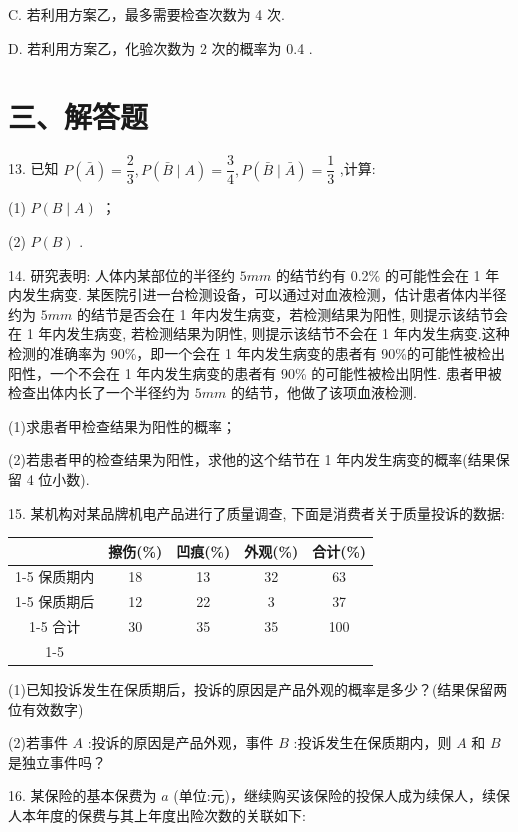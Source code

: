 C. 若利用方案乙，最多需要检查次数为 4 次.

D. 若利用方案乙，化验次数为 2 次的概率为 0.4 .

\section*{三、解答题}

13. 已知 $P\left( \bar{A}\right)  = \dfrac{2}{3},P\left( {\bar{B} \mid  A}\right)  = \dfrac{3}{4},P\left( {\bar{B} \mid  \bar{A}}\right)  = \dfrac{1}{3}$ ,计算:

(1) $P\left( {B \mid  A}\right)$ ；

(2) $P\left( B\right)$ .

14. 研究表明: 人体内某部位的半径约 $5{{mm}}$ 的结节约有 0.2\% 的可能性会在 1 年内发生病变. 某医院引进一台检测设备，可以通过对血液检测，估计患者体内半径约为 $5{{mm}}$ 的结节是否会在 1 年内发生病变，若检测结果为阳性, 则提示该结节会在 1 年内发生病变, 若检测结果为阴性, 则提示该结节不会在 1 年内发生病变.这种检测的准确率为 90\%，即一个会在 1 年内发生病变的患者有 90\%的可能性被检出阳性，一个不会在 1 年内发生病变的患者有 90\% 的可能性被检出阴性. 患者甲被检查出体内长了一个半径约为 $5{{mm}}$ 的结节，他做了该项血液检测.

(1)求患者甲检查结果为阳性的概率；

(2)若患者甲的检查结果为阳性，求他的这个结节在 1 年内发生病变的概率(结果保留 4 位小数).

15. 某机构对某品牌机电产品进行了质量调查, 下面是消费者关于质量投诉的数据:

\begin{center}
\begin{tabular}{|c|c|c|c|c|}
\hline
\phantom{X} & 擦伤(\%) & 凹痕(\%) & 外观(\%) & 合计(\%) \\
\cline{1-5}
保质期内 & 18 & 13 & 32 & 63 \\
\cline{1-5}
保质期后 & 12 & 22 & 3 & 37 \\
\cline{1-5}
合计 & 30 & 35 & 35 & 100 \\
\cline{1-5}
\hline
\end{tabular}
\end{center}

(1)已知投诉发生在保质期后，投诉的原因是产品外观的概率是多少？(结果保留两位有效数字)

(2)若事件 $A$ :投诉的原因是产品外观，事件 $B$ :投诉发生在保质期内，则 $A$ 和 $B$ 是独立事件吗？

16. 某保险的基本保费为 $a$ (单位:元)，继续购买该保险的投保人成为续保人，续保人本年度的保费与其上年度出险次数的关联如下:

